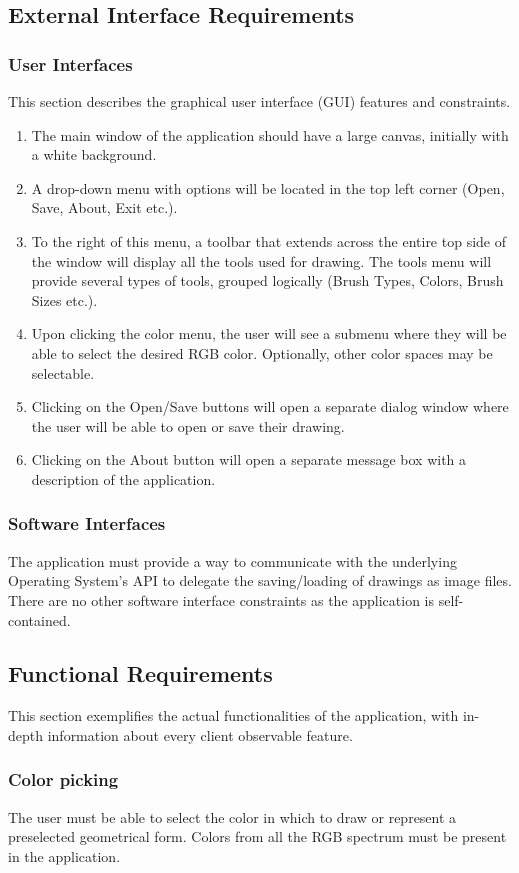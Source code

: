 \documentclass{article}
\begin{document}
\subsection{External Interface Requirements}
\subsubsection{User Interfaces}
This section describes the graphical user interface (GUI) features and constraints.
\begin{enumerate}
\item The main window of the application should have a large canvas, initially with a white background.
\item A drop-down menu with options will be located in the top left corner (Open, Save, About, Exit etc.).
\item To the right of this menu, a toolbar that extends across the entire top side of the window will display all the tools used for drawing. The tools menu will provide several types of tools, grouped logically (Brush Types, Colors, Brush Sizes etc.).
\item Upon clicking the color menu, the user will see a submenu where they will be able to select the desired RGB color. Optionally, other color spaces may be selectable.
\item Clicking on the Open/Save buttons will open a separate dialog window where the user will be able to open or save their drawing.
\item Clicking on the About button will open a separate message box with a description of the application.
\end{enumerate}

\subsubsection{Software Interfaces}
The application must provide a way to communicate with the underlying Operating System's API to delegate the saving/loading of drawings as image files. There are no other software interface constraints as the application is self-contained.
\subsection{Functional Requirements}
This section exemplifies the actual functionalities of the application, with in-depth information about every client observable feature.
\subsubsection{Color picking}
The user must be able to select the color in which to draw or represent a preselected geometrical form. Colors from all the RGB spectrum must be present in the application.
\end{document}
